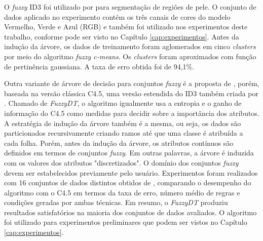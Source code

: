 O \emph{fuzzy} ID3 foi utilizado por \citet{bhatt:09} para segmentação de regiões de pele. O conjunto de dados aplicado no experimento contém os três canais de cores do modelo Vermelho, Verde e Azul (RGB) e também foi utilizado nos experimentos deste trabalho, conforme pode ser visto no Capítulo \ref{cap:experimentos}. Antes da indução da árvore, os dados de treinamento foram aglomerados em cinco \emph{clusters} por meio do algoritmo \emph{fuzzy c-means}. Os \emph{clusters} foram aproximados com função de pertinência gaussiana. A taxa de erro obtida foi de 94,1\%.

Outra variante de árvore de decisão para conjuntos \emph{fuzzy} é a proposta de \citet{cintra:13}, porém, baseada na versão clássica C4.5, uma versão estendida do ID3 também criada por \citet{quinlan:93}. Chamado de \emph{FuzzyDT}, o algoritmo igualmente usa a entropia e o ganho de informação do C4.5 como medidas para decidir sobre a importância dos atributos. A estratégia de indução da árvore também é a mesma, ou seja, os dados são particionados recursivamente criando ramos até que uma classe é atribuída a cada folha. Porém, antes da indução da árvore, os atributos contínuos são definidos em termos de conjuntos \emph{fuzzy}. Em outras palavras, a árvore é induzida com os valores dos atributos "discretizados". O domínio dos conjuntos \emph{fuzzy} devem ser estabelecidos previamente pelo usuário. Experimentos foram realizados com 16 conjuntos de dados distintos obtidos de \citet{lichman:13}, comparando o desempenho do algoritmo com o C4.5 em termos da taxa de erro, número médio de regras e condições geradas por ambas técnicas. Em resumo, o \emph{FuzzyDT} produziu resultados satisfatórios na maioria dos conjuntos de dados avaliados. O algoritmo foi utilizado para experimentos preliminares que podem ser vistos no Capítulo \ref{cap:experimentos}.

